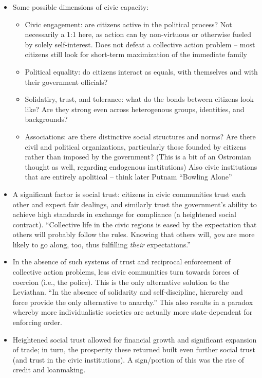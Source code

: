\documentclass[12pt]{article}
\begin{document}
\begin{itemize}[leftmargin=*, itemsep=4pt]
    \item Some possible dimensions of civic capacity:
    \begin{itemize}
        \item Civic engagement: are citizens active in the political process? Not necessarily a 1:1 here, as action can by non-virtuous or otherwise fueled by solely self-interest. Does not defeat a collective action problem -- most citizens still look for short-term maximization of the immediate family
        \item Political equality: do citizens interact as equals, with themselves and with their government officials?
        \item Solidatiry, trust, and tolerance: what do the bonds between citizens look like? Are they strong even across heterogenous groups, identities, and backgrounds?
        \item Associations: are there distinctive social structures and norms? Are there civil and political organizations, particularly those founded by citizens rather than imposed by the government? (This is a bit of an Ostromian thought as well, regarding endogenous institutions) Also civic institutions that are entirely apolitical -- think later Putnam ``Bowling Alone''
    \end{itemize}
    \item A significant factor is social trust: citizens in civic communities trust each other and expect fair dealings, and similarly trust the government's ability to achieve high standards in exchange for compliance (a heightened social contract). ``Collective life in the civic regions is eased by the expectation that others will probably follow the rules. Knowing that others will, \emph{you} are more likely to go along, too, thus fulfilling \emph{their} expectations.''
    \item In the absence of such systems of trust and reciprocal enforcement of collective action problems, less civic communities turn towards forces of coercion (i.e., the police). This is the only alternative solution to the Leviathan. ``In the absence of solidarity and self-discipline, hierarchy and force provide the only alternative to anarchy.'' This also results in a paradox whereby more individualistic societies are actually more state-dependent for enforcing order.
    \item Heightened social trust allowed for financial growth and significant expansion of trade; in turn, the prosperity these returned built even further social trust (and trust in the civic institutions). A sign/portion of this was the rise of credit and loanmaking.

\end{itemize}
\end{document}

